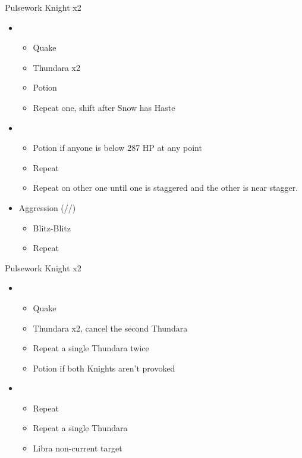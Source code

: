 \begin{paracol}{2}
	\renewcommand{\fifth}{[5] Malevolence (\rav/\rav/\syn)}
	\renewcommand{\sixth}{[6] Aggression (\com/\com/\rav)}
\switchcolumn*
	\begin{battle}{Pulsework Knight x2}
		\begin{itemize}
			\item \first
			      \begin{itemize}
				      \item Quake
				      \item Thundara x2
				      \item Potion
				      \item Repeat one, shift after Snow has Haste
			      \end{itemize}
			\item \second
			      \begin{itemize}
				      \item Potion if anyone is below 287 HP at any point
				      \item Repeat
				      \item Repeat on other one until one is staggered and the other is near stagger.
			      \end{itemize}
			\item \sixth
			      \begin{itemize}
				      \item Blitz-Blitz
				      \item Repeat
			      \end{itemize}
		\end{itemize}
	\end{battle}
	\switchcolumn
	\begin{battle}{Pulsework Knight x2}
\begin{itemize}
    \item \first
    \begin{itemize}
        \item Quake
        \item Thundara x2, cancel the second Thundara
        \item Repeat a single Thundara twice
        \item Potion if both Knights aren't provoked
    \end{itemize}
    \item \third
    \begin{itemize}
        \item Repeat
        \item Repeat a single Thundara
        \item Libra non-current target

\end{itemize}
\end{itemize}
\end{battle}
\end{paracol}
